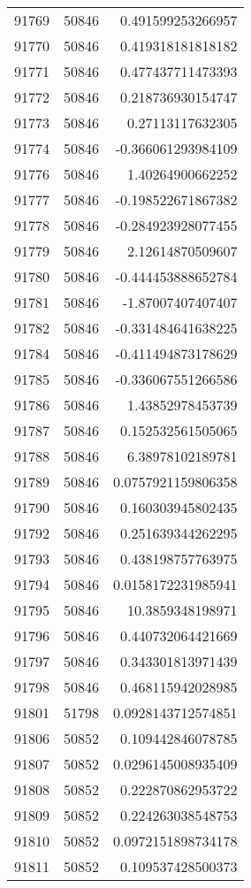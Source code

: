 \begin{tabular}{r | r | r}
91769 & 50846 & 0.491599253266957 \\
91770 & 50846 & 0.419318181818182 \\
91771 & 50846 & 0.477437711473393 \\
91772 & 50846 & 0.218736930154747 \\
91773 & 50846 & 0.27113117632305 \\
91774 & 50846 & -0.366061293984109 \\
91776 & 50846 & 1.40264900662252 \\
91777 & 50846 & -0.198522671867382 \\
91778 & 50846 & -0.284923928077455 \\
91779 & 50846 & 2.12614870509607 \\
91780 & 50846 & -0.444453888652784 \\
91781 & 50846 & -1.87007407407407 \\
91782 & 50846 & -0.331484641638225 \\
91784 & 50846 & -0.411494873178629 \\
91785 & 50846 & -0.336067551266586 \\
91786 & 50846 & 1.43852978453739 \\
91787 & 50846 & 0.152532561505065 \\
91788 & 50846 & 6.38978102189781 \\
91789 & 50846 & 0.0757921159806358 \\
91790 & 50846 & 0.160303945802435 \\
91792 & 50846 & 0.251639344262295 \\
91793 & 50846 & 0.438198757763975 \\
91794 & 50846 & 0.0158172231985941 \\
91795 & 50846 & 10.3859348198971 \\
91796 & 50846 & 0.440732064421669 \\
91797 & 50846 & 0.343301813971439 \\
91798 & 50846 & 0.468115942028985 \\
91801 & 51798 & 0.0928143712574851 \\
91806 & 50852 & 0.109442846078785 \\
91807 & 50852 & 0.0296145008935409 \\
91808 & 50852 & 0.222870862953722 \\
91809 & 50852 & 0.224263038548753 \\
91810 & 50852 & 0.0972151898734178 \\
91811 & 50852 & 0.109537428500373 \\

\end{tabular}

